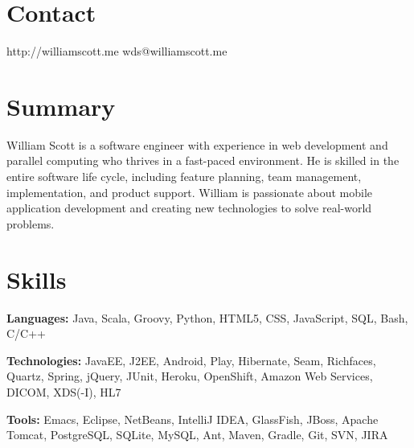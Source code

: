 \documentclass[margin,line]{resume}
\begin{document}
\begin{resume}
	\vspace{-4mm}


  \section{\mysidestyle \textcolor{mySideColor}{Contact}}

	http://williamscott.me \hfill wds@williamscott.me




  \section{\mysidestyle \textcolor{mySideColor}{Summary}}

  William Scott is a software engineer with experience in web
  development and parallel computing who thrives in a fast-paced
  environment. He is skilled in the entire software life cycle,
  including feature planning, team management, implementation, and
  product support. William is passionate about mobile application
  development and creating new technologies to solve real-world
  problems.


  \section{\mysidestyle \textcolor{mySideColor}{Skills}}

  \textbf{Languages:} Java, Scala, Groovy, Python, HTML5, CSS,
  JavaScript, SQL, Bash, C/C++
	\vspace{-2mm}

  \textbf{Technologies:} JavaEE, J2EE, Android, Play, Hibernate, Seam,
  Richfaces, Quartz, Spring, jQuery, JUnit, Heroku, OpenShift, Amazon
  Web Services, DICOM, XDS(-I), HL7
	\vspace{-2mm}

  \textbf{Tools:} Emacs, Eclipse, NetBeans, IntelliJ IDEA, GlassFish,
  JBoss, Apache Tomcat, PostgreSQL, SQLite, MySQL, Ant, Maven, Gradle,
  Git, SVN, JIRA
	\vspace{-2mm}


\end{resume}
\end{document}
